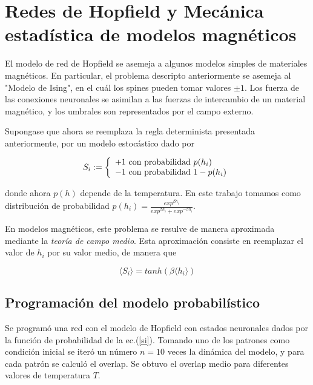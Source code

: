 \documentclass[aps,prb,onecolumn,10pt,floatfix,superscriptaddress]{article} %
\begin{document}

\section{Redes de Hopfield y Mec\'anica estad\'istica de modelos magn\'eticos}

El modelo de red de Hopfield se asemeja a algunos modelos simples de materiales magn\'eticos. En particular, el problema descripto anteriormente se asemeja al "Modelo de Ising", en el cu\'al los spines pueden tomar valores $\pm 1$. Los fuerza de las conexiones neuronales se asimilan a las fuerzas de intercambio de un material magn\'etico, y los umbrales son representados por el campo externo.

Supongase que ahora se reemplaza la regla determinista presentada anteriormente, por un modelo estoc\'astico dado por

\begin{equation}
\label{si}
S_{i} :=  
 \left\lbrace
 \begin{array}{l}
+1 $ con probabilidad $ p(h_i)\\
-1 $ con probabilidad $ 1-p(h_i)
\end{array}\right.
\end{equation}

donde ahora $p(h)$ depende de la temperatura. En este trabajo tomamos como distribuci\'on de probabilidad $p(h_i) = \frac{exp^{\beta h_i}}{exp^{\beta h_{i}}+exp^{-\beta h_{i}}}$.

En modelos magn\'eticos, este problema se resulve de manera aproximada mediante la \textit{teor\'ia de campo medio}. Esta aproximaci\'on consiste en reemplazar el valor de $h_{i}$ por su valor medio, de manera que 

\begin{equation}
\langle S_{i} \rangle = tanh (\beta \langle h_{i} \rangle)
\end{equation}

\subsection{Programaci\'on del modelo probabil\'istico}

Se program\'o una red con el modelo de Hopfield con estados neuronales dados por la funci\'on de probabilidad de la ec.(\ref{si}). Tomando uno de los patrones como condici\'on inicial se iter\'o un n\'umero $n = 10$ veces la din\'amica del modelo, y para cada patr\'on se calcul\'o el overlap. Se obtuvo el overlap medio para diferentes valores de temperatura $T$.
\end{document}
